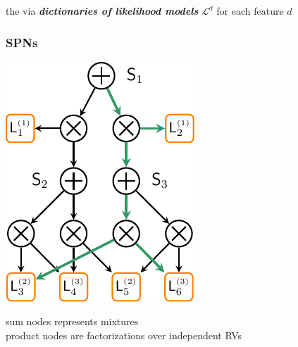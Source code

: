 \documentclass[xcolor={usenames,dvipsnames,svgnames}, compress, aspectratio=169, 11pt]{beamer}
\begin{document}
\begin{frame}[t, htt=bgrey2]
\begin{minipage}[t]{0.3\linewidth}
  \end{minipage}\hfill\begin{minipage}[t]{0.4\linewidth}
    \vspace{-150pt}
      the 
  via \textbf{\emph{dictionaries of likelihood models}} $\mathcal{L}^{d}$ for each
  feature $d$
  \end{minipage}  
\end{frame}


\begin{frame}[t, htt=bgrey2]
  \frametitle{SPNs}

  \large
  \begin{minipage}[t]{0.3\linewidth}
    \includegraphics[width=.99\linewidth]{figures/hspn}
  \end{minipage}\hfill\begin{minipage}[t]{0.3\linewidth}
    \vspace{-150pt}
    sum nodes represents mixtures\\
    product nodes are factorizations over independent RVs\\

\end{minipage}
\end{frame}
\end{document}
